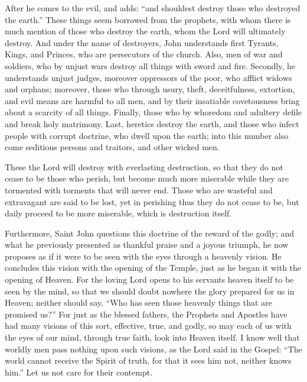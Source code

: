 After he comes to the evil, and adds: “and shouldest destroy those who destroyed the earth.” These things seem borrowed from the prophets, with whom there is much mention of those who destroy the earth, whom the Lord will ultimately destroy. And under the name of destroyers, John understands first Tyrants, Kings, and Princes, who are persecutors of the church. Also, men of war and soldiers, who by unjust wars destroy all things with sword and fire. Secondly, he understands unjust judges, moreover oppressors of the poor, who afflict widows and orphans; moreover, those who through usury, theft, deceitfulness, extortion, and evil means are harmful to all men, and by their insatiable covetousness bring about a scarcity of all things. Finally, those who by whoredom and adultery defile and break holy matrimony. Last, heretics destroy the earth, and those who infect people with corrupt doctrine, who dwell upon the earth; into this number also come seditious persons and traitors, and other wicked men.

These the Lord will destroy with everlasting destruction, so that they do not cease to be those who perish, but become much more miserable while they are tormented with torments that will never end. Those who are wasteful and extravagant are said to be lost, yet in perishing thus they do not cease to be, but daily proceed to be more miserable, which is destruction itself.

Furthermore, Saint John questions this doctrine of the reward of the godly; and what he previously presented as thankful praise and a joyous triumph, he now proposes as if it were to be seen with the eyes through a heavenly vision. He concludes this vision with the opening of the Temple, just as he began it with the opening of Heaven. For the loving Lord opens to his servants heaven itself to be seen by the mind, so that we should doubt nowhere the glory prepared for us in Heaven; neither should say, “Who has seen those heavenly things that are promised us?” For just as the blessed fathers, the Prophets and Apostles have had many visions of this sort, effective, true, and godly, so may each of us with the eyes of our mind, through true faith, look into Heaven itself. I know well that worldly men pass nothing upon such visions, as the Lord said in the Gospel: “The world cannot receive the Spirit of truth, for that it sees him not, neither knows him.” Let us not care for their contempt.


